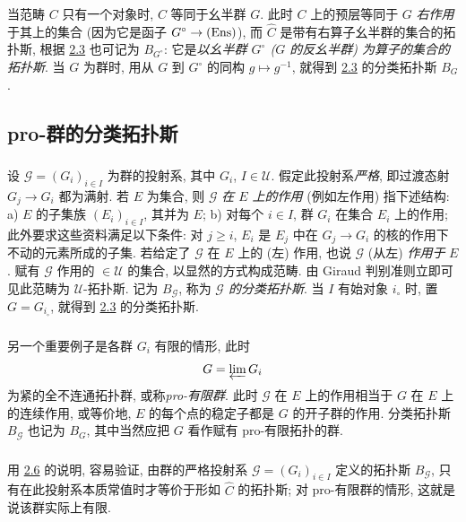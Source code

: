 当范畴 $C$ 只有一个对象时, $C$ 等同于幺半群 $G$. 此时 $C$ 上的预层等同于 $G$ \emph{右作用}于其上的集合 (因为它是函子 $G^{\circ}\rightarrow (\operatorname{Ens})$), 而 $\widehat{C}$ 是带有右算子幺半群的集合的拓扑斯, 根据 \hyperref[IV.subsec2.3]{2.3} 也可记为 $B_{G^{\circ}}$: 它是\emph{以幺半群 $G^{\circ}$ ($G$ 的反幺半群) 为算子的集合的拓扑斯}. 当 $G$ 为群时, 用从 $G$ 到 $G^{\circ}$ 的同构 $g\mapsto g^{-1}$, 就得到 \hyperref[IV.subsec2.3]{2.3} 的分类拓扑斯 $B_G$.

\subsection{pro-群的分类拓扑斯}

\subsubsection{}
设 $𝒢=(G_i)_{i\in I}$ 为群的投射系, 其中 $G_i$, $I\in 𝒰$. 假定此投射系\emph{严格}, 即过渡态射 $G_j\rightarrow G_i$ 都为满射. 若 $E$ 为集合, 则 $𝒢$ \emph{在 $E$ 上的作用} (例如左作用) 指下述结构: a) $E$ 的子集族 $(E_i)_{i\in I}$, 其并为 $E$; b) 对每个 $i\in I$, 群 $G_i$ 在集合 $E_i$ 上的作用; 此外要求这些资料满足\pageoriginale 以下条件: 对 $j\geq i$, $E_i$ 是 $E_j$ 中在 $G_j\rightarrow G_i$ 的核的作用下不动的元素所成的子集. 若给定了 $𝒢$ 在 $E$ 上的 (左) 作用, 也说 $𝒢$ (从左) \emph{作用于} $E$. 赋有 $𝒢$ 作用的 $\in 𝒰$ 的集合, 以显然的方式构成范畴. 由 Giraud 判别准则立即可见此范畴为 $𝒰$-拓扑斯. 记为 $B_{𝒢}$, 称为 \emph{$𝒢$ 的分类拓扑斯}. 当 $I$ 有始对象 $i_{\circ}$ 时, 置 $G=G_{i_\circ}$, 就得到 \hyperref[IV.subsec2.3]{2.3} 的分类拓扑斯.

\subsubsection{}
另一个重要例子是各群 $G_i$ 有限的情形, 此时
$$
G=\varprojlim G_i
$$
为紧的全不连通拓扑群, 或称\emph{pro-有限群}. 此时 $𝒢$ 在 $E$ 上的作用相当于 $G$ 在 $E$ 上的连续作用, 或等价地, $E$ 的每个点的稳定子都是 $G$ 的开子群的作用. 分类拓扑斯 $B_{𝒢}$ 也记为 $B_{G}$, 其中当然应把 $G$ 看作赋有 pro-有限拓扑的群.

\subsubsection{}
用 \hyperref[IV.subsec2.6]{2.6} 的说明, 容易验证, 由群的严格投射系 $𝒢=(G_i)_{i\in I}$ 定义的拓扑斯 $B_{𝒢}$, 只有在此投射系本质常值时才等价于形如 $\widehat{C}$ 的拓扑斯; 对 pro-有限群的情形, 这就是说该群实际上有限.


